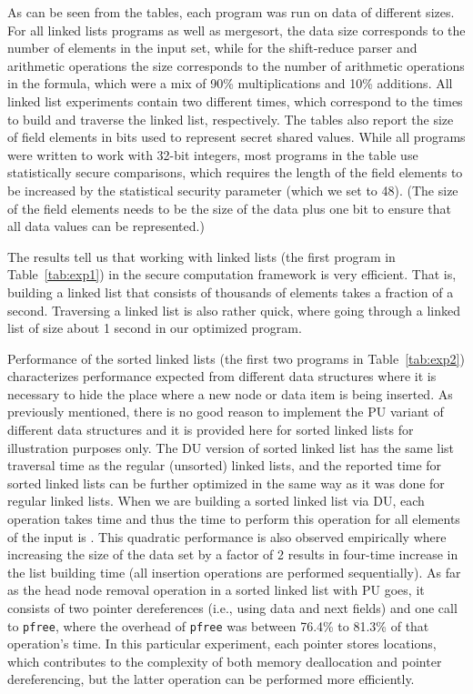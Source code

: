 \documentclass[11pt]{article}
\begin{document}
As can be seen from the tables, each program was run on data of different 
sizes. For all linked lists programs as well as mergesort, the data size
corresponds to the number of elements in the input set, while for the
shift-reduce parser and arithmetic operations the size corresponds to the
number of arithmetic operations in the formula, which were a mix of 90\%
multiplications and 10\% additions. All linked list experiments contain two
different times, which correspond to the times to build and traverse the
linked list, respectively. The tables also report the size of field elements
in bits used to represent secret shared values. While all programs were
written to work with 32-bit integers, most programs in the table use
statistically secure comparisons, which requires the length of the field
elements to be increased by the statistical security parameter (which we set
to 48). (The size of the field elements needs to be the size
of the data plus one bit to ensure that all data values can be represented.)

The results tell us that working with linked lists (the first program in
Table~\ref{tab:exp1}) in the secure computation framework is very efficient.
That is, building a linked list that consists of thousands of elements takes
a fraction of a second. Traversing a linked list is also rather quick, where
going through a linked list of size  about 1 second in our optimized
program. 

Performance of the sorted linked lists (the first two programs in
Table~\ref{tab:exp2}) characterizes performance expected from different data
structures where it is necessary to hide the place where a new node or data
item is being inserted. As previously mentioned, there is no good reason to
implement the PU variant of different data structures and it is provided
here for sorted linked lists for illustration purposes only. The DU version
of sorted linked list has the same list traversal time as the regular
(unsorted) linked lists, and the reported time for sorted linked lists can
be further optimized in the same way as it was done for regular linked
lists. When we are building a sorted linked list via DU, each operation
takes  time and thus the time to perform this operation for all 
elements of the input is . This quadratic performance is also
observed empirically where increasing the size of the data set by a factor
of 2 results in four-time increase in the list building time (all insertion
operations are performed sequentially).  As far as the head node removal
operation in a sorted linked list with PU goes, it consists of two pointer
dereferences (i.e., using data and next fields) and one call to
\texttt{pfree}, where the overhead of \texttt{pfree} was between 76.4\% to
81.3\% of that operation's time. In this particular experiment, each pointer
stores  locations, which contributes to the complexity of both memory
deallocation and pointer dereferencing, but the latter operation can be
performed more efficiently.
\end{document}
